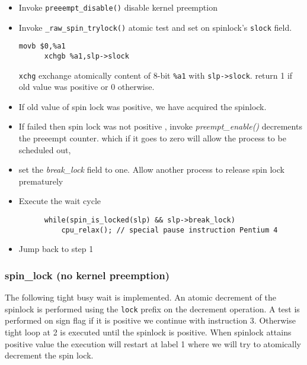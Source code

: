 \documentclass{article}
\begin{document}
  \begin{itemize}
  \item Invoke \lstinline{preeempt_disable()} disable kernel preemption
    
  \item Invoke \lstinline{_raw_spin_trylock()} atomic test and set on
    spinlock's \lstinline{slock} field.

      \begin{lstlisting}[language=anX86]
      movb $0,%a1
      xchgb %a1,slp->slock
      \end{lstlisting}


      \lstinline{xchg} exchange atomically content of 8-bit
      \lstinline{%a1} with \lstinline{slp->slock}.  return 1 if old
      value was positive or 0 otherwise.

    \item If old value of spin lock was positive, we have acquired the
      spinlock.
        
    \item If failed then spin lock was not positive , invoke
      \emph{preempt\_enable()} decrements the preeempt counter. which
      if it goes to zero will allow the process to be scheduled out,

    \item set the \emph{break\_lock} field to one. Allow another
      process to release spin lock prematurely

    \item Execute the wait cycle
      \begin{lstlisting}
      while(spin_is_locked(slp) && slp->break_lock)
          cpu_relax(); // special pause instruction Pentium 4
      \end{lstlisting}
    \item Jump back to step 1       
  \end{itemize}


  \subsubsection{spin\_lock (no kernel preemption)}

  The following tight busy wait is implemented. An atomic decrement of
  the spinlock is performed using the \lstinline{lock} prefix on the
  decrement operation. A test is performed on sign flag if it is
  positive we continue with instruction 3. Otherwise tight loop at 2
  is executed until the spinlock is positive. When spinlock attains
  positive value the execution will restart at label 1 where we will
  try to atomically decrement the spin lock.
\end{document}
